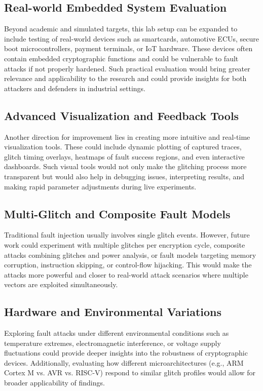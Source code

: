 \subsection*{Real-world Embedded System Evaluation}
Beyond academic and simulated targets, this lab setup can be expanded to include testing of real-world devices such as smartcards, automotive ECUs, secure boot microcontrollers, payment terminals, or IoT hardware. These devices often contain embedded cryptographic functions and could be vulnerable to fault attacks if not properly hardened. Such practical evaluation would bring greater relevance and applicability to the research and could provide insights for both attackers and defenders in industrial settings.

\subsection*{Advanced Visualization and Feedback Tools}
Another direction for improvement lies in creating more intuitive and real-time visualization tools. These could include dynamic plotting of captured traces, glitch timing overlays, heatmaps of fault success regions, and even interactive dashboards. Such visual tools would not only make the glitching process more transparent but would also help in debugging issues, interpreting results, and making rapid parameter adjustments during live experiments.

\subsection*{Multi-Glitch and Composite Fault Models}
Traditional fault injection usually involves single glitch events. However, future work could experiment with multiple glitches per encryption cycle, composite attacks combining glitches and power analysis, or fault models targeting memory corruption, instruction skipping, or control-flow hijacking. This would make the attacks more powerful and closer to real-world attack scenarios where multiple vectors are exploited simultaneously.

\subsection*{Hardware and Environmental Variations}
Exploring fault attacks under different environmental conditions such as temperature extremes, electromagnetic interference, or voltage supply fluctuations could provide deeper insights into the robustness of cryptographic devices. Additionally, evaluating how different microarchitectures (e.g., ARM Cortex M vs. AVR vs. RISC-V) respond to similar glitch profiles would allow for broader applicability of findings.

